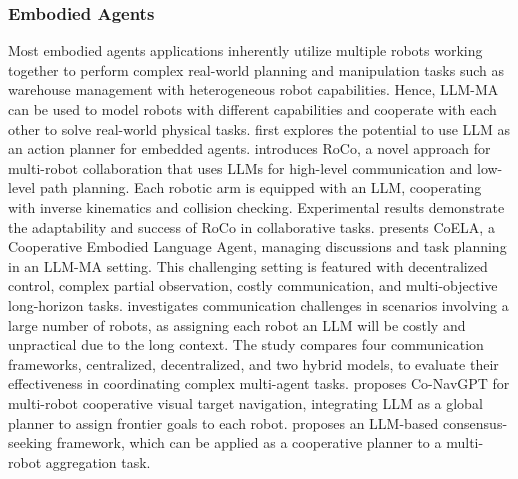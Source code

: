 \subsubsection{Embodied Agents}
Most embodied agents applications inherently utilize multiple robots working together to perform complex real-world planning and manipulation tasks such as warehouse management with heterogeneous robot capabilities. Hence, LLM-MA can be used to model robots with different capabilities and cooperate with each other to solve real-world physical tasks.
\cite{dasgupta2023collaborating} first explores the potential to use LLM as an action planner for embedded agents. \cite{mandi2023roco} introduces RoCo, a novel approach for multi-robot collaboration that uses LLMs for high-level communication and low-level path planning. Each robotic arm is equipped with an LLM, cooperating with inverse kinematics and collision checking. Experimental results demonstrate the adaptability and success of RoCo in collaborative tasks. \cite{zhang2023building} presents CoELA, a Cooperative Embodied Language Agent, managing discussions and task planning in an LLM-MA setting. This challenging setting is featured with decentralized control, complex partial observation, costly communication, and multi-objective long-horizon tasks. \cite{chen2023scalable} investigates communication challenges in scenarios involving a large number of robots, as assigning each robot an LLM will be costly and unpractical due to the long context. The study compares four communication frameworks, centralized, decentralized, and two hybrid models, to evaluate their effectiveness in coordinating complex multi-agent tasks. \cite{yu2023conavgpt} proposes Co-NavGPT for multi-robot cooperative visual target navigation, integrating LLM as a global planner to assign frontier goals to each robot. \cite{chen2023multi} proposes an LLM-based consensus-seeking framework, which can be applied as a cooperative planner to a multi-robot aggregation task.




